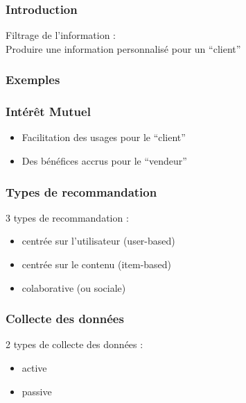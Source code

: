 \begin{frame}
  \frametitle{Introduction}
  Filtrage de l'information : \\
  \newline
  Produire une information personnalisé pour un ``client''
\end{frame}

\begin{frame}
  \frametitle{Exemples}
  \begin{minipage}[l]{0.33\linewidth}
  \end{minipage}\hfill
  \begin{minipage}[l]{0.33\linewidth}
  \end{minipage}\hfill
  \begin{minipage}[l]{0.33\linewidth}
  \end{minipage}\hfill
\end{frame}

\begin{frame}
  \frametitle{Intérêt Mutuel}
  \begin{itemize}[<+->]
  \item Facilitation des usages pour le ``client''
  \item Des bénéfices accrus pour le ``vendeur''
  \end{itemize}
\end{frame}

\begin{frame}
  \frametitle{Types de recommandation}
  3 types de recommandation :
  \begin{itemize}[<+->]
  \item centrée sur l'utilisateur (user-based)
  \item centrée sur le contenu (item-based)
  \item colaborative (ou sociale)
  \end{itemize}
\end{frame}

\begin{frame}
  \frametitle{Collecte des données}
  2 types de collecte des données : 
  \begin{itemize}[<+->]
  \item active
  \item passive
  \end{itemize}
\end{frame}
